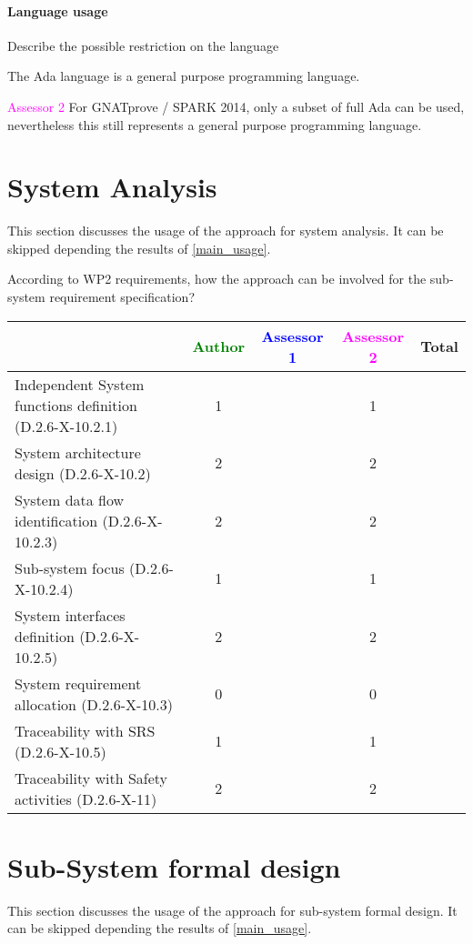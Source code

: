 \paragraph{Language usage} Describe the possible restriction on the language

The Ada language is a general purpose programming language.

\textcolor{magenta}{Assessor 2} For GNATprove / SPARK 2014, only a subset of
full Ada can be used, nevertheless this still represents a general purpose
programming language.

\section{System Analysis}
This section discusses the usage of the approach for system analysis.
It can be skipped depending the results of \ref{main_usage}.

According to WP2 requirements, how the approach can be involved for
the sub-system requirement specification?

\begin{tabular}{|l | c | c | c | c|}
\hline
& \textcolor{green}{Author} & \textcolor{blue}{Assessor 1} & \textcolor{magenta}{Assessor 2} & Total \\
\hline
Independent System functions definition (D.2.6-X-10.2.1)  & 1 & & 1 &  \\
\hline
System architecture design (D.2.6-X-10.2) & 2 & & 2 &  \\
\hline
System data flow identification (D.2.6-X-10.2.3)  & 2 & & 2 &  \\
\hline
Sub-system focus (D.2.6-X-10.2.4)  & 1 & & 1 &  \\
\hline
System interfaces definition (D.2.6-X-10.2.5)  & 2 & & 2 &  \\
\hline
System requirement allocation (D.2.6-X-10.3)  & 0 & & 0 &  \\
\hline
Traceability with SRS (D.2.6-X-10.5)  & 1 & & 1 &  \\
\hline
Traceability with Safety activities (D.2.6-X-11)  & 2 & & 2 &  \\
\hline
\end{tabular}



\section{Sub-System formal design}
This section discusses the usage of the approach for sub-system formal design.
It can be skipped depending the results of \ref{main_usage}.

